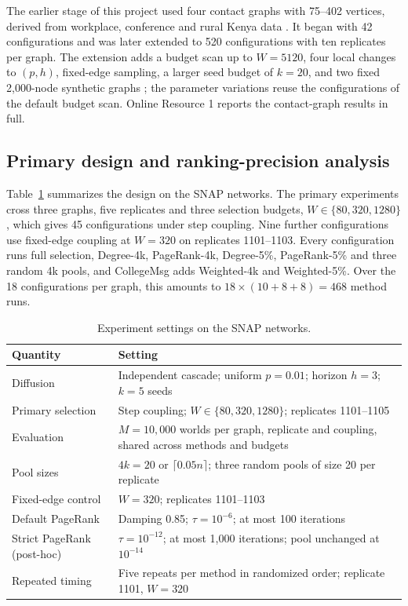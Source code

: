 \documentclass[smallextended]{svjour3}
\begin{document}
The earlier stage of this project used four contact graphs with 75--402 vertices, derived from workplace, conference and rural Kenya data \cite{ref3,ref4,ref5,ref6}. It began with 42 configurations and was later extended to 520 configurations with ten replicates per graph. The extension adds a budget scan up to $W=5120$, four local changes to $(p,h)$, fixed-edge sampling, a larger seed budget of $k=20$, and two fixed 2,000-node synthetic graphs \cite{ref17,ref18}; the parameter variations reuse the configurations of the default budget scan. Online Resource 1 reports the contact-graph results in full.

\subsection{Primary design and ranking-precision analysis}
Table~\ref{tab:settings} summarizes the design on the SNAP networks. The primary experiments cross three graphs, five replicates and three selection budgets, $W\in\{80,320,1280\}$, which gives 45 configurations under step coupling. Nine further configurations use fixed-edge coupling at $W=320$ on replicates 1101--1103. Every configuration runs full selection, Degree-4k, PageRank-4k, Degree-5\%, PageRank-5\% and three random 4k pools, and CollegeMsg adds Weighted-4k and Weighted-5\%. Over the 18 configurations per graph, this amounts to $18\times(10+8+8)=468$ method runs.

\begin{table}[htbp]
\caption{Experiment settings on the SNAP networks.}\label{tab:settings}
\begin{tabularx}{\linewidth}{lX}
\toprule
Quantity & Setting \\
\midrule
Diffusion & Independent cascade; uniform $p=0.01$; horizon $h=3$; $k=5$ seeds \\
Primary selection & Step coupling; $W\in\{80,320,1280\}$; replicates 1101--1105 \\
Evaluation & $M=10{,}000$ worlds per graph, replicate and coupling, shared across methods and budgets \\
Pool sizes & $4k=20$ or $\lceil0.05n\rceil$; three random pools of size 20 per replicate \\
Fixed-edge control & $W=320$; replicates 1101--1103 \\
Default PageRank & Damping 0.85; $\tau=10^{-6}$; at most 100 iterations \\
Strict PageRank (post-hoc) & $\tau=10^{-12}$; at most 1,000 iterations; pool unchanged at $10^{-14}$ \\
Repeated timing & Five repeats per method in randomized order; replicate 1101, $W=320$ \\
\bottomrule
\end{tabularx}
\end{table}
\end{document}
